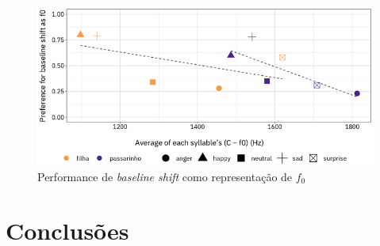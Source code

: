 \documentclass[11pt]{article}
\begin{document}
\begin{figure}[H]
     {\centering
\includegraphics[width=\linewidth]{fig/baseline_shift_as_pitch.png}
     \caption{Performance de {\itshape baseline shift} como representação de $f_0$}
     \label{fig:baseline_shift_as_f0}\par}
\end{figure}

\section{Conclus\~{o}es}
  \label{sec:conclusoes}

  

   
\end{document}
